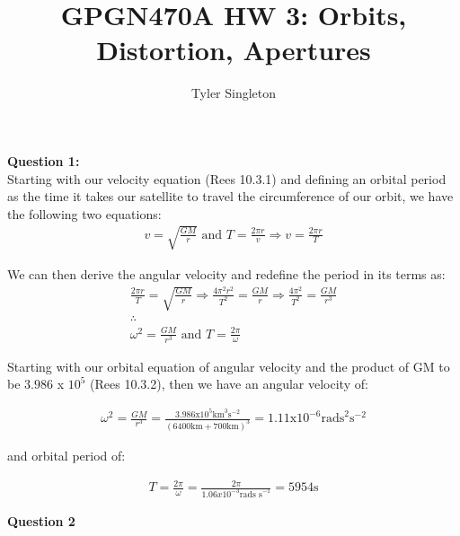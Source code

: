 \documentclass{homework}
\title{GPGN470A HW 3: Orbits, Distortion, Apertures}
\author{Tyler Singleton}
\begin{document}
\maketitle

\textbf{Question 1:} \\

Starting with our velocity equation (Rees 10.3.1) and defining an orbital period as the time it takes our satellite to travel the circumference of our orbit, we have the following two equations: 
\begin{gather*}\label{eq:velocity}
    v = \sqrt{\frac{GM}{r}} \text{ and } T = \frac{2\pi r}{v} \Rightarrow v = \frac{2\pi r}{T}
\end{gather*}

We can then derive the angular velocity and redefine the period in its terms as: 
\begin{gather*}
    \frac{2\pi r}{T} = \sqrt{\frac{GM}{r}} \Rightarrow
    \frac{4\pi^2 r^2}{T^2} = \frac{GM}{r} \Rightarrow
    \frac{4\pi^2}{T^2} = \frac{GM}{r^3} \\
    \therefore \\
    \omega^2 = \frac{GM}{r^3} \text{ and } T = \frac{2\pi}{\omega}
\end{gather*}

Starting with our orbital equation of angular velocity and the product of GM to be $3.986$ x $10^5$ (Rees 10.3.2), then we have an angular velocity of: 

\begin{gather*}
    \omega^2 
        = \frac{GM}{r^3}
        = \frac{3.986 \text{x} 10^{5}                             \text{km}^{3}\text{s}^{-2}}
            {(6400 \text{km} + 700 \text{km})^3}
        = 1.11 \text{x} 10^{-6} \text{rads}^2 \text{s}^{-2} 
\end{gather*}

and orbital period of:

\begin{gather*}
    T = \frac{2\pi}{\omega} = \frac{2\pi}{1.06x10^{-3} \text{rads s}^{-1}} = 5954\text{s}
\end{gather*}

\textbf{Question 2}
\end{document}

